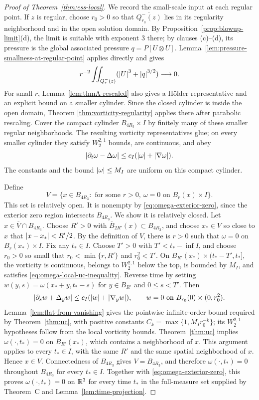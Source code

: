 \documentclass[11pt,letterpaper]{article}
\numberwithin{equation}{section}
\theoremstyle{plain}
\theoremstyle{definition}
\theoremstyle{remark}
\begin{document}
\begin{proof}[Proof of Theorem~\ref{thm:ess-local}]
We record the small-scale input at each regular point. If $z$ is regular,
choose $r_0>0$ so that $\overline{Q_{r_0}^-(z)}$ lies in its regularity
neighborhood and in the open solution domain. By Proposition~\ref{prop:blowup-limit}(d), the limit is suitable with exponent $3$ there;
by clauses (c)--(d), its pressure is the global associated pressure
$q=P[U\otimes U]$. Lemma~\ref{lem:pressure-smallness-at-regular-point}
applies directly and gives
\[
 r^{-2}\iint_{Q_r^-(z)}(\left\lvert U\right\rvert^3+\left\lvert q\right\rvert^{3/2})\longrightarrow0.
\]
For small $r$, Lemma~\ref{lem:thmA-rescaled} also gives a Hölder
representative and an explicit bound on a smaller cylinder. Since the
closed cylinder is inside the open domain, Theorem
\ref{thm:vorticity-regularity} applies there after parabolic rescaling.
Cover the compact cylinder $\overline{B_{4R_3}}\times\overline I$ by
finitely many of these smaller regular neighborhoods. The resulting
vorticity representatives glue; on every smaller cylinder they satisfy
$W^{2,1}_2$ bounds, are continuous, and obey
\begin{equation}\label{eq:omega-local-uc-inequality}
 \left\lvert \partial_t\omega-\Delta\omega\right\rvert
       \le c_I(\left\lvert \omega\right\rvert+\left\lvert \nabla\omega\right\rvert).
\end{equation}
The constants and the bound $\left\lvert \omega\right\rvert\le M_I$ are uniform on this
compact cylinder.

Define
\[
 V=\{x\in B_{4R_3}:\text{ for some }r>0,
       \ \omega=0\text{ on }B_r(x)\times I\}.
\]
This set is relatively open. It is nonempty by
\eqref{eq:omega-exterior-zero}, since the exterior zero region intersects
$B_{4R_3}$. We show it is relatively closed. Let
$x\in\overline V\cap B_{4R_3}$. Choose $R'>0$ with
$\overline B_{2R'}(x)\subset B_{4R_3}$, and choose $x_\ast\in V$ so close
to $x$ that $\left\lvert x-x_\ast\right\rvert<R'/2$. By the definition of $V$, there is
$r>0$ such that $\omega=0$ on $B_r(x_\ast)\times I$.
Fix any $t_\ast\in I$. Choose $T'>0$ with
$T'<t_\ast-\inf I$, and choose
$r_0>0$ so small that $r_0<\min\{r,R'\}$ and $r_0^2<T'$. On
$B_{R'}(x_\ast)\times(t_\ast-T',t_\ast]$, the vorticity is continuous,
belongs to $W^{2,1}_2$ below the top, is bounded by $M_I$, and satisfies
\eqref{eq:omega-local-uc-inequality}. Reverse time by setting
$w(y,s)=\omega(x_\ast+y,t_\ast-s)$ for $y\in B_{R'}$ and
$0\le s<T'$. Then
\[
 \left\lvert \partial_s w+\Delta_yw\right\rvert
 \le c_I(\left\lvert w\right\rvert+\left\lvert \nabla_yw\right\rvert),\qquad
 w=0\text{ on }B_{r_0}(0)\times(0,r_0^2).
\]
Lemma~\ref{lem:flat-from-vanishing} gives the pointwise infinite-order
bound required by Theorem~\ref{thm:uc}, with positive constants
$C_k=\max\{1,M_Ir_0^{-k}\}$; its $W^{2,1}_2$ hypotheses follow
from the local vorticity bounds. Theorem~\ref{thm:uc} implies
$\omega(\cdot,t_\ast)=0$ on $B_{R'}(x_\ast)$, which contains a neighborhood
of $x$. This argument applies to every $t_\ast\in I$, with the same
$R'$ and the same spatial neighborhood of $x$. Hence $x\in V$.
Connectedness of $B_{4R_3}$ gives $V=B_{4R_3}$, and therefore
$\omega(\cdot,t_\ast)=0$ throughout $B_{4R_3}$ for every
$t_\ast\in I$. Together with \eqref{eq:omega-exterior-zero}, this proves
$\omega(\cdot,t_\ast)=0$ on $\mathbb{R}^3$ for every time $t_\ast$ in the
full-measure set supplied by Theorem~C and Lemma~\ref{lem:time-projection}.


\end{proof}
\end{document}
